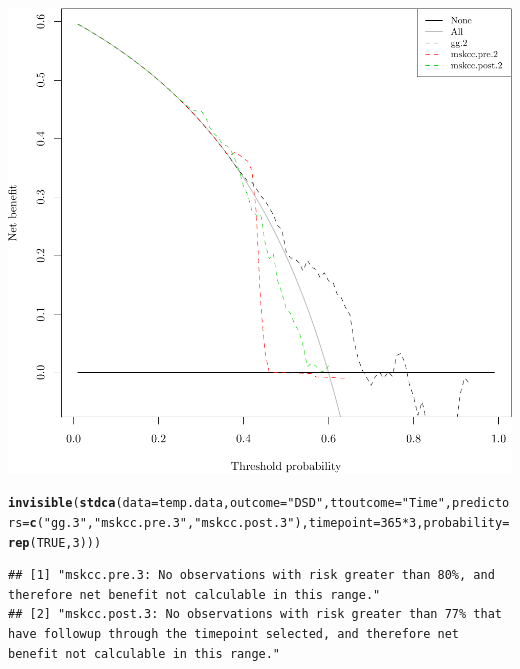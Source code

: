 \documentclass{article}\usepackage[]{graphicx}\usepackage[]{color}
\makeatletter
\def\maxwidth{ %
  \ifdim\Gin@nat@width>\linewidth
    \linewidth
  \else
    \Gin@nat@width
  \fi
}
\newcommand{\hlnum}[1]{\textcolor[rgb]{0.686,0.059,0.569}{#1}}%
\newcommand{\hlstr}[1]{\textcolor[rgb]{0.192,0.494,0.8}{#1}}%
\newcommand{\hlopt}[1]{\textcolor[rgb]{0,0,0}{#1}}%
\newcommand{\hlstd}[1]{\textcolor[rgb]{0.345,0.345,0.345}{#1}}%
\newcommand{\hlkwc}[1]{\textcolor[rgb]{0.333,0.667,0.333}{#1}}%
\newcommand{\hlkwd}[1]{\textcolor[rgb]{0.737,0.353,0.396}{\textbf{#1}}}%
\newenvironment{kframe}{%
 \def\at@end@of@kframe{}%
 \ifinner\ifhmode%
  \def\at@end@of@kframe{\end{minipage}}%
  \begin{minipage}{\columnwidth}%
 \fi\fi%
 \def\FrameCommand##1{\hskip\@totalleftmargin \hskip-\fboxsep
 \colorbox{shadecolor}{##1}\hskip-\fboxsep
     \hskip-\linewidth \hskip-\@totalleftmargin \hskip\columnwidth}%
 \MakeFramed {\advance\hsize-\width
   \@totalleftmargin\z@ \linewidth\hsize
   \@setminipage}}%
 {\par\unskip\endMakeFramed%
 \at@end@of@kframe}
\newenvironment{knitrout}{}{} %
\makeatother
\begin{document}
\begin{knitrout}
{\centering \includegraphics[width=\maxwidth]{figure/07-model-selection-dca-2} 

}


\begin{kframe}\begin{alltt}
\hlkwd{invisible}\hlstd{(}\hlkwd{stdca}\hlstd{(}\hlkwc{data} \hlstd{= temp.data,} \hlkwc{outcome} \hlstd{=} \hlstr{"DSD"}\hlstd{,} \hlkwc{ttoutcome} \hlstd{=} \hlstr{"Time"}\hlstd{,} \hlkwc{predictors} \hlstd{=} \hlkwd{c}\hlstd{(}\hlstr{"gg.3"}\hlstd{,} \hlstr{"mskcc.pre.3"}\hlstd{,} \hlstr{"mskcc.post.3"}\hlstd{),} \hlkwc{timepoint} \hlstd{=} \hlnum{365}\hlopt{*}\hlnum{3}\hlstd{,} \hlkwc{probability} \hlstd{=} \hlkwd{rep}\hlstd{(}\hlnum{TRUE}\hlstd{,} \hlnum{3}\hlstd{)))}
\end{alltt}
\begin{verbatim}
## [1] "mskcc.pre.3: No observations with risk greater than 80%, and therefore net benefit not calculable in this range."                                                   
## [2] "mskcc.post.3: No observations with risk greater than 77% that have followup through the timepoint selected, and therefore net benefit not calculable in this range."
\end{verbatim}
\end{kframe}


\end{knitrout}
\end{document}
